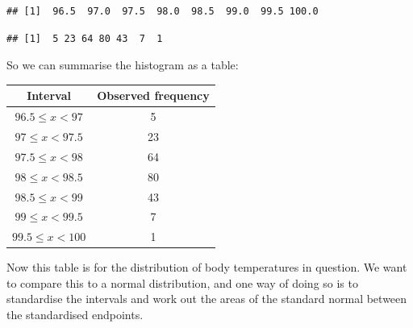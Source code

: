 \documentclass[
]{book}
\newenvironment{Shaded}{\begin{snugshade}}{\end{snugshade}}
\newcommand{\CommentTok}[1]{\textcolor[rgb]{0.56,0.35,0.01}{\textit{#1}}}
\newcommand{\NormalTok}[1]{#1}
\newcommand{\OperatorTok}[1]{\textcolor[rgb]{0.81,0.36,0.00}{\textbf{#1}}}
\theoremstyle{definition}
\theoremstyle{definition}
\theoremstyle{definition}
\theoremstyle{definition}
\theoremstyle{remark}
\begin{document}
\begin{verbatim}
## [1]  96.5  97.0  97.5  98.0  98.5  99.0  99.5 100.0
\end{verbatim}

\begin{Shaded}
\end{Shaded}

\begin{verbatim}
## [1]  5 23 64 80 43  7  1
\end{verbatim}

So we can summarise the histogram as a table:

\begin{longtable}[]{@{}cc@{}}
\toprule
Interval & Observed frequency\tabularnewline
\midrule
\endhead
\(96.5\leq x < 97\) & 5\tabularnewline
\(97\leq x < 97.5\) & 23\tabularnewline
\(97.5\leq x < 98\) & 64\tabularnewline
\(98\leq x < 98.5\) & 80\tabularnewline
\(98.5\leq x < 99\) & 43\tabularnewline
\(99\leq x < 99.5\) & 7\tabularnewline
\(99.5\leq x < 100\) & 1\tabularnewline
\bottomrule
\end{longtable}

Now this table is for the distribution of body temperatures in question. We want to compare this to a normal distribution, and one way of doing so is to standardise the intervals and work out the areas of the standard normal between the standardised endpoints.
\end{document}
